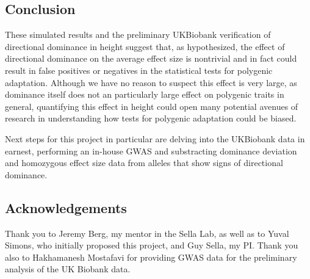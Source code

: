 \documentclass[a4paper,12pt]{article}
\begin{document}
\subsection*{Conclusion}
These simulated results and the preliminary UKBiobank verification of
directional dominance in height suggest that, as hypothesized, the
effect of directional dominance on the average effect size is
nontrivial and in fact could result in false positives or negatives in
the statistical tests for polygenic adaptation. Although we have no
reason to suspect this effect is very large, as dominance
itself does not an particularly large effect on polygenic traits in
general, quantifying this effect in height could open many potential
avenues of research in understanding how tests for polygenic
adaptation could be biased.

Next steps for this project in particular are delving into the
UKBiobank data in earnest, performing an in-house GWAS and
substracting dominance deviation and homozygous effect size data from
alleles that show signs of directional dominance.

\subsection*{Acknowledgements}
Thank you to Jeremy Berg, my mentor in the Sella Lab, as well as to
Yuval Simons, who initially proposed this project, and Guy Sella, my
PI. Thank you also to Hakhamanesh Mostafavi for providing GWAS data
for the preliminary analysis of the UK Biobank data. 


\pagebreak


\end{document}
